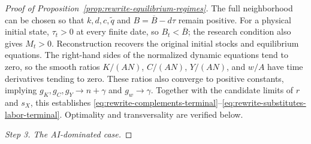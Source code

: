 \begin{proof}[Proof of Proposition~\ref{prop:rewrite-equilibrium-regimes}]
The full neighborhood can be chosen so that $k,d,c,\widetilde q$ and
$B=\overline B-d\tau$ remain positive. For a physical initial state,
$\tau_t>0$ at every finite date, so $B_t<\overline B$; the research
condition also gives $M_t>0$. Reconstruction recovers the original initial
stocks and equilibrium equations. The right-hand sides of the normalized
dynamic equations tend to zero, so the smooth ratios $K/(AN)$, $C/(AN)$, $Y/(AN)$, and $w/A$
have time derivatives tending to zero. These ratios also converge to
positive constants, implying $g_K,g_C,g_Y\to n+\gamma$ and
$g_w\to\gamma$. Together with the candidate limits of $r$ and $s_X$,
this establishes
\eqref{eq:rewrite-complements-terminal}--\eqref{eq:rewrite-substitutes-labor-terminal}.
Optimality and transversality are verified below.

\par\medskip\noindent\textit{Step 3. The AI-dominated case.}


\end{proof}

